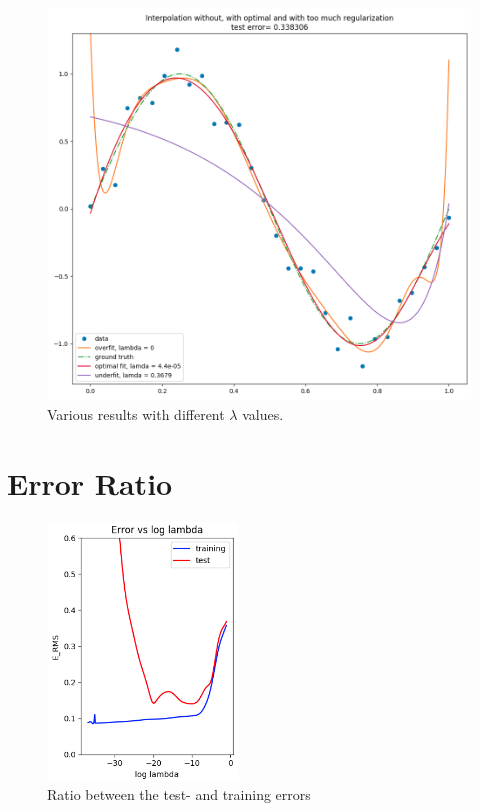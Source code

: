 \documentclass{article}
\begin{document}
\begin{figure}[h]
	\centering
	\includegraphics[width=\linewidth]{plots/full4cropped.png}
	\caption{Various results with different $\lambda$ values. }
	\label{plot:full4cropped}
\end{figure}


\newpage
\section{Error Ratio}

\begin{figure} %
	\centering
	\includegraphics[width=0.45\textwidth]{plots/error4cropped.png}
	\caption{Ratio between the test- and training errors}
	\label{plot:error4cropped}
\end{figure}
\end{document}
